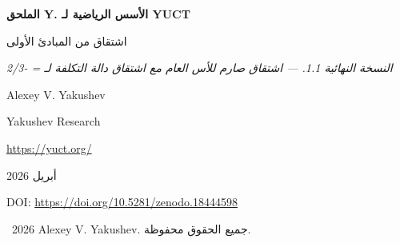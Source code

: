 \documentclass[11pt,a4paper]{article}
\begin{document}
	
	\begin{titlepage}
		\centering
		\vspace*{0cm}
		
		{\Huge\bfseries الملحق Y. الأسس الرياضية لـ YUCT\par}
		\vspace{0.3cm}
		{\Large اشتقاق من المبادئ الأولى\par}
		\vspace{0.3cm}
		{\large \textit{النسخة النهائية 1.1. — اشتقاق صارم للأس العام مع اشتقاق دالة التكلفة لـ \mu = -2/3}\par}
		\vspace{1.5cm}
		
		{\large Alexey V. Yakushev\par}
		\vspace{0.3cm}
		{\normalsize Yakushev Research\par}
		{\normalsize \url{https://yuct.org/}\par}
		
		\vspace{0.5cm}
		{\normalsize أبريل 2026\par}
		\vspace{0.3cm}
		{\normalsize DOI: \url{https://doi.org/10.5281/zenodo.18444598}\par}
		
		\vfill
		
		\begin{abstract}
			\noindent
			يقدم هذا المستند الأسس الرياضية لنظرية التنسيق الموحدة ياكوشيف (YUCT) بشكل صارم ومكتفٍ ذاتيًا. انطلاقًا من تعريف عناقيد التنسيق ومعامل الكفاءة \(K_{\mathrm{eff}}\)، نبني نموذجًا مجهريًا لشبكة التنسيق. من ثلاث بديهيات أساسية — الثبات القياسي الهرمي، اكتمال القاموس الثنائي، والغمر ثلاثي الأبعاد — نحدد توزيع الإنتروبيا عبر المستويات. بإضافة بديهية رابعة للثبات القياسي الكلي ودالة تكلفة صريحة لتسليم المؤشر، نشتق قانون الخطأ العام \(\varepsilon \propto K_{\mathrm{eff}}^{-\beta}\) مع \(\beta = 2/3\) كنظرية. ثم يتم تقديم الفعل الفعال القياسي-المتجهي لحقل التنسيق، ومعادلات أينشتاين المعدلة، والأصل الطوبولوجي للثابت الكوني، وتدرج كتل الفرميونات كنتائج أو تخمينات مبنية على النظرية الأساسية. جميع العبارات مُوسومة بوضوح كبديهية، نظرية، تخمين، افتراض، أو قانون ظاهراتي. تقدم النظرية تنبؤات ملموسة قابلة للدحض، بما في ذلك ثابت جاذبية يعتمد على درجة الحرارة. يربط قسم جديد قانون الخطأ العام بالتوزيع المقارب للأعداد الأولية (النظرية~4 من النص الرئيسي)، موضحًا أن نفس الأس \(\beta = 2/3\) يتحكم في تقلبات الأعداد الأولية.
		\end{abstract}
		
		\vspace{0.5cm}
		\textcopyright\ 2026 Alexey V. Yakushev. جميع الحقوق محفوظة.
	\end{titlepage}
	
\end{document}
